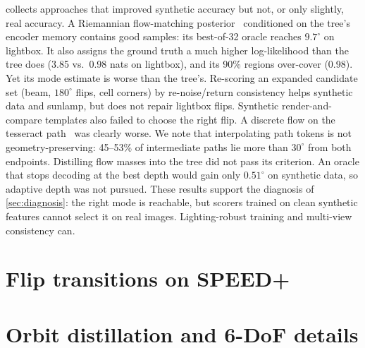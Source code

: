  collects approaches that improved synthetic accuracy but not, or only slightly, real accuracy.
A Riemannian flow-matching posterior~\cite{chen2024rfm} conditioned on the tree's encoder memory contains good samples: its best-of-32 oracle reaches $9.7^\circ$ on lightbox. It also assigns the ground truth a much higher log-likelihood than the tree does (3.85 vs.\ 0.98 nats on lightbox), and its 90\% regions over-cover (0.98). Yet its mode estimate is worse than the tree's.
Re-scoring an expanded candidate set (beam, $180^\circ$ flips, cell corners) by re-noise/return consistency helps synthetic data and sunlamp, but does not repair lightbox flips. Synthetic render-and-compare templates also failed to choose the right flip.
A discrete flow on the tesseract path~\cite{gat2024dfm} was clearly worse. We note that interpolating path tokens is not geometry-preserving: 45--53\% of intermediate paths lie more than $30^\circ$ from both endpoints.
Distilling flow masses into the tree did not pass its criterion.
An oracle that stops decoding at the best depth would gain only $0.51^\circ$ on synthetic data, so adaptive depth was not pursued.
These results support the diagnosis of \cref{sec:diagnosis}: the right mode is reachable, but scorers trained on clean synthetic features cannot select it on real images. Lighting-robust training and multi-view consistency can.

\section{Flip transitions on SPEED+}
\begin{table}[h]
  \centering\small
  \setlength{\tabcolsep}{2.6pt}
  
  \caption{\textbf{Flip transitions relative to the clean PoE tree.} \emph{Fixed}: share of the clean tree's ${>}150^\circ$ errors that become ${<}20^\circ$ (denominator given). \emph{Broken}: share of its ${<}20^\circ$ predictions that become ${>}150^\circ$.}
  \label{tab:flips}
\end{table}

\section{Orbit distillation and 6-DoF details}
\begin{table}[h]
  \centering\footnotesize
  \setlength{\tabcolsep}{2.4pt}
  
  \caption{\textbf{SPEED+ 6-DoF} with the SPACE-HOP translation target, ground-truth crops. Rotation uses PoE or DINOv3 orbit voting. Translation ($\hat t$) is predicted from one view or as the orbit average; seed std of $E_T$ ${\le}\,0.005$\,m. \emph{Box only} uses no image: the object centre is placed at the box centre and the depth at the training mean of $U_z$.}
  \label{tab:sixdof}
\end{table}

